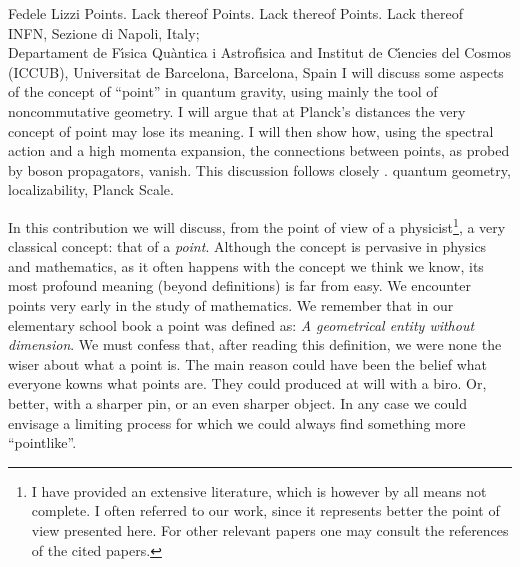 \begin{artengenv}{Fedele Lizzi}
	{Points. Lack thereof}
	{Points. Lack thereof}
	{Points. Lack thereof}
	{\\
	INFN, Sezione di Napoli, Italy;\\
	Departament de F\'{\i}sica Qu\`antica i Astrof\'{\i}sica and Institut de C\'{\i}encies del Cosmos (ICCUB),
	Universitat de Barcelona, Barcelona, Spain}
	{I will discuss some aspects of the concept of ``point'' in quantum gravity, using mainly the tool of noncommutative geometry. I will argue that at Planck's distances the very concept of point may lose its meaning. I will then show how, using the spectral action and a high momenta expansion,  the connections between points, as probed by boson propagators, vanish. This discussion follows closely \parencite{Kuliva}.}
	{quantum geometry, localizability, Planck Scale.}
	



\lettrine[loversize=0.13,lines=2,lraise=-0.05,nindent=0em,findent=0.2pt]%
{I}{}n this contribution we will discuss, from the point of view of a physicist\footnote{I have provided an extensive literature, which is however by all means not complete. I often referred to our work, since it represents better the point of view presented here. For other relevant papers one may consult the references of the cited papers.}, a very classical concept: that of a \emph{point}. Although the concept is pervasive in physics and mathematics, as it often happens with the concept we think we know, its most profound meaning (beyond definitions) is far from easy. We encounter points very early in the study of mathematics. We remember that in our elementary school book a point was defined as: \emph{A geometrical entity without dimension}. We must confess that, after reading this definition, we were none the wiser about what a point is. The main reason could have been the belief what everyone kowns what  points are. They could produced at will with a biro. Or, better, with a sharper pin, or an even sharper object. In any case we could envisage a limiting process for which we could always find something more ``pointlike''.


\end{artengenv}
